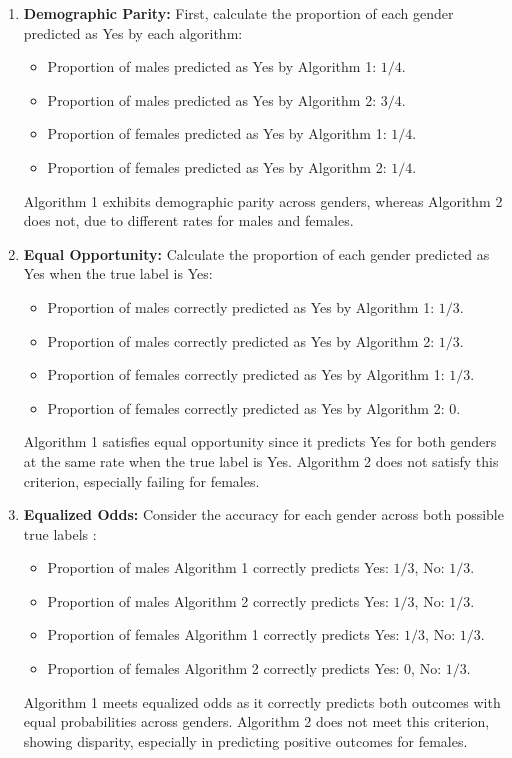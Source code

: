 \documentclass[
	12pt, %
]{fphw}
\begin{document}
\begin{enumerate}
    \item \textbf{Demographic Parity:}
    First, calculate the proportion of each gender predicted as Yes by each algorithm:
    \begin{itemize}
        \item Proportion of males predicted as Yes by Algorithm 1: $1/4$.
        \item Proportion of males predicted as Yes by Algorithm 2: $3/4$.
        \item Proportion of females predicted as Yes by Algorithm 1: $1/4$.
        \item Proportion of females predicted as Yes by Algorithm 2: $1/4$.
    \end{itemize}
    Algorithm 1 exhibits demographic parity across genders, whereas Algorithm 2 does not, due to different rates for males and females.

    \item \textbf{Equal Opportunity:}
    Calculate the proportion of each gender predicted as Yes when the true label is Yes:
    \begin{itemize}
        \item Proportion of males correctly predicted as Yes by Algorithm 1: $1/3$.
        \item Proportion of males correctly predicted as Yes by Algorithm 2: $1/3$.
        \item Proportion of females correctly predicted as Yes by Algorithm 1: $1/3$.
        \item Proportion of females correctly predicted as Yes by Algorithm 2: $0$.
    \end{itemize}
    Algorithm 1 satisfies equal opportunity since it predicts Yes for both genders at the same rate when the true label is Yes. Algorithm 2 does not satisfy this criterion, especially failing for females.

    \item \textbf{Equalized Odds:}
    Consider the accuracy for each gender across both possible true labels :
    \begin{itemize}
        \item Proportion of males Algorithm 1 correctly predicts Yes: $1/3$, No: $1/3$.
        \item Proportion of males Algorithm 2 correctly predicts Yes: $1/3$, No: $1/3$.
        \item Proportion of females Algorithm 1 correctly predicts Yes: $1/3$, No: $1/3$.
        \item Proportion of females Algorithm 2 correctly predicts Yes: $0$, No: $1/3$.
    \end{itemize}
    Algorithm 1 meets equalized odds as it correctly predicts both outcomes with equal probabilities across genders. Algorithm 2 does not meet this criterion, showing disparity, especially in predicting positive outcomes for females.

\end{enumerate}
\end{document}
